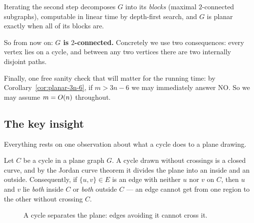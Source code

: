 Iterating the second step decomposes $G$ into its \emph{blocks} (maximal
$2$-connected subgraphs), computable in linear time by depth-first search, and
$G$ is planar exactly when all of its blocks are.

So from now on: \textbf{$G$ is $2$-connected.} Concretely we use two
consequences: every vertex lies on a cycle, and between any two vertices there
are two internally disjoint paths.

Finally, one free sanity check that will matter for the running time: by
Corollary~\ref{cor:planar-3n-6}, if $m > 3n - 6$ we may immediately answer NO. So we
may assume $m = O\!\left(n\right)$ throughout.

\subsection{The key insight}

Everything rests on one observation about what a cycle does to a plane drawing.

\begin{observation}\label{obs:planar-key}
Let $C$ be a cycle in a plane graph $G$. A cycle drawn without crossings is a
closed curve, and by the Jordan curve theorem it divides the plane into an
inside and an outside. Consequently, if $\{u,v\} \in E$ is an edge with
neither $u$ nor $v$ on $C$, then $u$ and $v$ lie \emph{both} inside $C$ or
\emph{both} outside $C$ --- an edge cannot get from one region to the other
without crossing $C$.
\end{observation}

\begin{figure}[ht]
\centering
{}
\caption{A cycle separates the plane: edges avoiding it cannot cross it.}
\label{fig:planar-jordan}
\end{figure}

